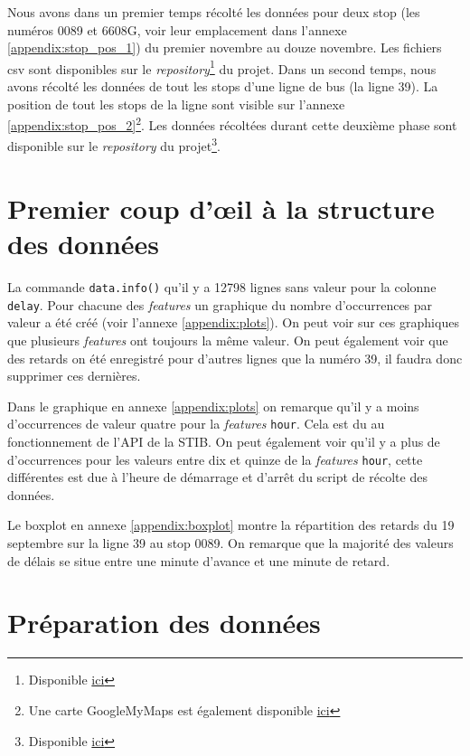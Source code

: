 \documentclass[12pt]{report}
\begin{document}
Nous avons dans un premier temps récolté les données pour deux stop (les numéros 0089 et 6608G, voir leur emplacement dans l'annexe \ref{appendix:stop_pos_1}) du premier novembre au douze novembre. Les fichiers csv sont disponibles sur le \textit{repository}\footnote{Disponible \href{https://github.com/jalbrecq/CanYouCatchIt/tree/main/sandbox/data/csv}{ici}} du projet. Dans un second temps, nous avons récolté les données de tout les stops d'une ligne de bus (la ligne 39). La position de tout les stops de la ligne sont visible sur l'annexe \ref{appendix:stop_pos_2}\footnote{Une carte GoogleMyMaps est également disponible \href{https://www.google.com/maps/d/edit?mid=1_qNGPUfuZXrqC3UZXkmDOWuhEHJfYAox&usp=sharing}{ici}}. Les données récoltées durant cette deuxième phase sont disponible sur le \textit{repository} du projet\footnote{Disponible \href{https://github.com/jalbrecq/CanYouCatchIt/tree/main/sandbox/data/csv2}{ici}}.

\section{Premier coup d'œil à la structure des données}
La commande \lstinline!data.info()! qu'il y a 12798 lignes sans valeur pour la colonne \lstinline!delay!. Pour chacune des \textit{features} un graphique du nombre d'occurrences par valeur a été créé (voir l'annexe \ref{appendix:plots}). On peut voir sur ces graphiques que plusieurs \textit{features} ont toujours la même valeur. On peut également voir que des retards on été enregistré pour d'autres lignes que la numéro 39, il faudra donc supprimer ces dernières.

Dans le graphique en annexe \ref{appendix:plots} on remarque qu'il y a moins d'occurrences de valeur quatre pour la \textit{features} \lstinline!hour!. Cela est du au fonctionnement de l'API de la STIB. On peut également voir qu'il y a plus de d'occurrences pour les valeurs entre dix et quinze de la \textit{features} \lstinline!hour!, cette différentes est due à l'heure de démarrage et d'arrêt du script de récolte des données.

Le boxplot en annexe \ref{appendix:boxplot} montre la répartition des retards du 19 septembre sur la ligne 39 au stop 0089. On remarque que la majorité des valeurs de délais se situe entre une minute d'avance et une minute de retard.

\section{Préparation des données}
\end{document}
